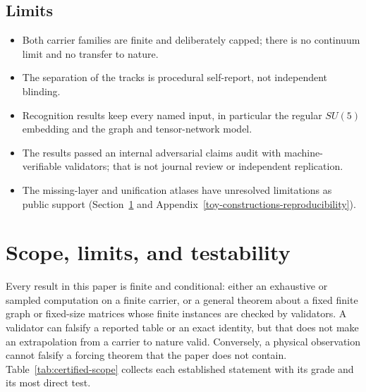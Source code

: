 \documentclass[11pt]{article}
\theoremstyle{definition}
\providecommand{\tightlist}{\setlength{\itemsep}{0pt}\setlength{\parskip}{0pt}}
\begin{document}
\subsection{Limits}\label{the-honest-bound-on-the-thesis}

\begin{itemize}\tightlist
\item Both carrier families are finite and deliberately capped; there is no continuum limit and no transfer to nature.
\item The separation of the tracks is procedural self-report, not independent blinding.
\item Recognition results keep every named input, in particular the regular \(SU(5)\) embedding and the graph and
  tensor-network model.
\item The results passed an internal adversarial claims audit with machine-verifiable validators; that is not journal
  review or independent replication.
\item The missing-layer and unification atlases have unresolved limitations as public support
  (Section~\ref{scope-limits-and-falsifiability} and Appendix~\ref{toy-constructions-reproducibility}).
\end{itemize}
 \section{Scope, limits, and testability}\label{scope-limits-and-falsifiability}

Every result in this paper is finite and conditional: either an exhaustive or sampled computation on a finite
carrier, or a general theorem about a fixed finite graph or fixed-size matrices whose finite instances are checked by
validators. A validator can falsify a reported table or an exact identity, but that does not make an extrapolation from
a carrier to nature valid. Conversely, a physical observation cannot
falsify a forcing theorem that the paper does not contain. Table~\ref{tab:certified-scope} collects each established
statement with its grade and its most direct test.
\end{document}
